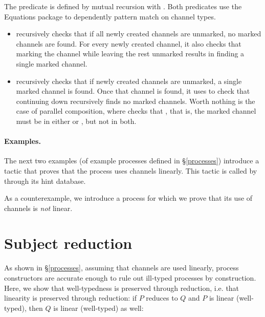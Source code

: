 \documentclass{mproj}
\begin{document}

The predicate  is defined by mutual recursion with . Both predicates use the Equations package to dependently pattern match on channel types.
\begin{itemize}
    \item {} recursively checks that if all newly created channels are unmarked, no marked channels are found. For every newly created channel, it also checks that marking the channel while leaving the rest unmarked results in  finding a single marked channel.  

    \item {} recursively checks that if newly created channels are unmarked, a single marked channel is found. Once that channel is found, it uses  to check that continuing down recursively finds no marked channels. Worth nothing is the case of parallel composition, where  checks that , that is, the marked channel must be in either  or , but not in both.
\end{itemize}

\paragraph{Examples.}

The next two examples (of example processes defined in \S \ref{processes}) introduce a tactic that proves that the process uses channels linearly. This tactic is called by  through its hint database.


As a counterexample, we introduce a process for which we prove that its use of channels is \emph{not} linear.


\section{Subject reduction}\label{subject-reduction}

As shown in \S \ref{processes}, assuming that channels are used linearly, process constructors are accurate enough to rule out ill-typed processes by construction. Here, we show that well-typedness is preserved through reduction, i.e. that linearity is preserved through reduction: if $P$ reduces to $Q$ and $P$ is linear (well-typed), then $Q$ is linear (well-typed) as well:
\end{document}

